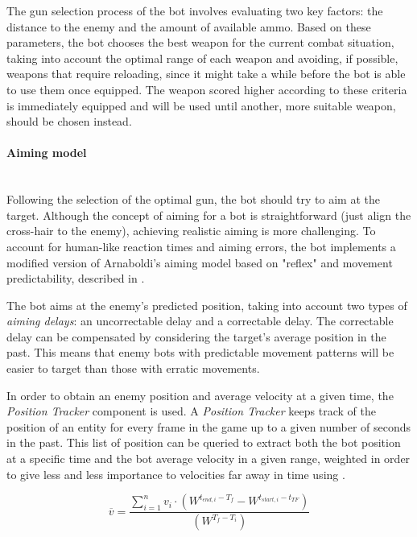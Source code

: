 The gun selection process of the bot involves evaluating two key factors: the distance to the enemy and the amount of available ammo. Based on these parameters, the bot chooses the best weapon for the current combat situation, taking into account the optimal range of each weapon and avoiding, if possible, weapons that require reloading, since it might take a while before the bot is able to use them once equipped. The weapon scored higher according to these criteria is immediately equipped and will be used until another, more suitable weapon, should be chosen instead.

\paragraph{Aiming model}\mbox{}\\
Following the selection of the optimal gun, the bot should try to aim at the target. Although the concept of aiming for a bot is straightforward (just align the cross-hair to the enemy), achieving realistic aiming is more challenging. To account for human-like reaction times and aiming errors, the bot implements a modified version of Arnaboldi's aiming model based on "reflex" and movement predictability, described in \citep{arnaboldi_framework}. 

The bot aims at the enemy's predicted position, taking into account two types of \textit{aiming delays}: an uncorrectable delay and a correctable delay. The correctable delay can be compensated by considering the target's average position in the past. This means that enemy bots with predictable movement patterns will be easier to target than those with erratic movements.

In order to obtain an enemy position and average velocity at a given time, the \textit{Position Tracker} component is used. A \textit{Position Tracker} keeps track of the position of an entity  for every frame in the game up to a given number of seconds in the past. This list of position can be queried to extract both the bot position at a specific time and the bot average velocity in a given range, weighted in order to give less and less importance to velocities far away in time using .

\begin{equation}
\overline{v} = \frac{\sum_{i=1}^{n} v_i \cdot \left( W^{t_{end,i} - T_{f}} - W^{t_{start,i} - t_{TF}} \right)}{ \left( W^{T_{f} - T_{i}} \right)} 
\label{eq:average_velocity}
\end{equation}

